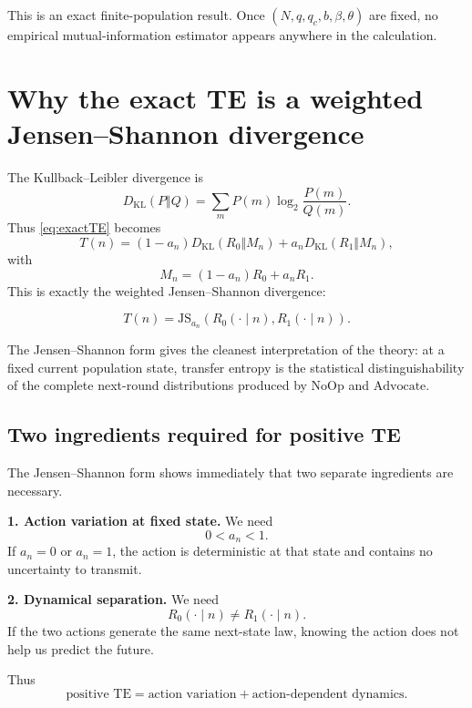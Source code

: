 \documentclass[11pt,a4paper]{article}
\newcommand{\Adv}{\ensuremath{\mathrm{Advocate}}}
\newcommand{\NoOp}{\ensuremath{\mathrm{NoOp}}}
\newcommand{\KL}{D_{\mathrm{KL}}}
\newcommand{\JS}{\mathrm{JS}}
\newcommand{\1}{\mathbbm{1}}
\begin{document}
This is an exact finite-population result. Once $(N,q,q_c,b,\beta,\theta)$ are fixed, no empirical mutual-information estimator appears anywhere in the calculation.

\section{Why the exact TE is a weighted Jensen--Shannon divergence}

The Kullback--Leibler divergence is
\begin{equation}
\KL(P\Vert Q)=\sum_m P(m)\log_2\frac{P(m)}{Q(m)}.
\end{equation}
Thus \cref{eq:exactTE} becomes
\begin{equation}
T(n)
=(1-a_n)\KL(R_0\Vert M_n)+a_n\KL(R_1\Vert M_n),
\end{equation}
with
\[
M_n=(1-a_n)R_0+a_nR_1.
\]
This is exactly the weighted Jensen--Shannon divergence:
\begin{resultbox}
\begin{equation}
\boxed{
T(n)=\JS_{a_n}\!\left(R_0(\cdot\mid n),R_1(\cdot\mid n)\right).}
\label{eq:JS}
\end{equation}
\end{resultbox}

\begin{intuitionbox}
The Jensen--Shannon form gives the cleanest interpretation of the theory: at a fixed current population state, transfer entropy is the statistical distinguishability of the complete next-round distributions produced by \NoOp{} and \Adv{}.
\end{intuitionbox}

\subsection{Two ingredients required for positive TE}

The Jensen--Shannon form shows immediately that two separate ingredients are necessary.

\textbf{1. Action variation at fixed state.} We need
\[
0<a_n<1.
\]
If $a_n=0$ or $a_n=1$, the action is deterministic at that state and contains no uncertainty to transmit.

\textbf{2. Dynamical separation.} We need
\[
R_0(\cdot\mid n)\neq R_1(\cdot\mid n).
\]
If the two actions generate the same next-state law, knowing the action does not help us predict the future.

Thus
\[
\boxed{\text{positive TE}=\text{action variation}+\text{action-dependent dynamics}.}
\]
\end{document}
